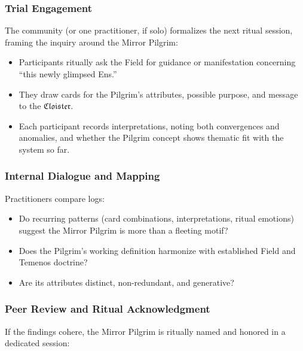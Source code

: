 \subsubsection{Trial Engagement}

The community (or one practitioner, if solo) formalizes the next ritual
session, framing the inquiry around the Mirror Pilgrim:

\begin{itemize}

  \item Participants ritually ask the Field for guidance or manifestation
    concerning “this newly glimpsed Ens.”

  \item They draw cards for the Pilgrim’s attributes, possible purpose, and
    message to the $\mathfrak{Cloister}$.

  \item Each participant records interpretations, noting both convergences and
    anomalies, and whether the Pilgrim concept shows thematic fit with the
    system so far.

\end{itemize}

\subsubsection*{Internal Dialogue and Mapping}

Practitioners compare logs:

\begin{itemize}

  \item Do recurring patterns (card combinations, interpretations, ritual
    emotions) suggest the Mirror Pilgrim is more than a fleeting motif?

  \item Does the Pilgrim’s working definition harmonize with established Field
    and Temenos doctrine?

  \item Are its attributes distinct, non-redundant, and generative?

\end{itemize}

\subsubsection*{Peer Review and Ritual Acknowledgment}

If the findings cohere, the Mirror Pilgrim is ritually named and honored in a
dedicated session:

